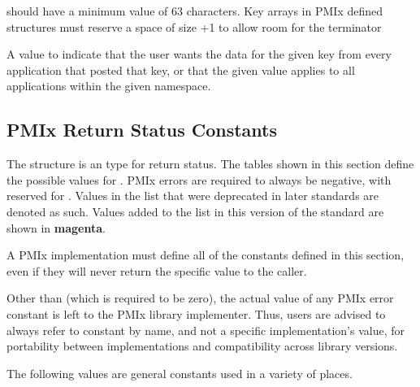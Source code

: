\adviceimplstart
{} should have a minimum value of 63 characters. Key arrays in \ac{PMIx} defined structures must reserve
a space of size +1 to allow room for the  terminator
\adviceimplend

\begin{constantdesc}
%
A value to indicate that the user wants the data for the given key from every application that posted that key, or that the given value applies to all applications within the given namespace.
\end{constantdesc}


\subsection{PMIx Return Status Constants}
\label{api:struct:errors}

The  structure is an  type for return status. The tables shown in this section define the possible values for .
PMIx errors are required to always be negative, with  reserved for . Values in the list that were deprecated in later standards are denoted as such. Values added to the list in this version of the standard are shown in \textbf{\color{magenta}magenta}.

\adviceimplstart
A PMIx implementation must define all of the constants defined in this section, even if they will never return the specific value to the caller.
\adviceimplend

\adviceuserstart
Other than  (which is required to be zero), the actual value of any \ac{PMIx} error constant is left to the \ac{PMIx} library implementer. Thus, users are advised to always refer to constant by name, and not a specific implementation's value, for portability between implementations and compatibility across library versions.
\adviceuserend

The following values are general constants used in a variety of places.

